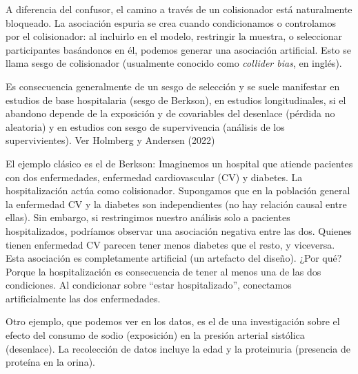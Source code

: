 \documentclass[
  spanish,
  a4paper,
]{scrbook}
\begin{document}
A diferencia del confusor, el camino a través de un colisionador está
naturalmente bloqueado. La asociación espuria se crea cuando
condicionamos o controlamos por el colisionador: al incluirlo en el
modelo, restringir la muestra, o seleccionar participantes basándonos en
él, podemos generar una asociación artificial. Esto se llama sesgo de
colisionador (usualmente conocido como \emph{collider bias}, en inglés).

Es consecuencia generalmente de un sesgo de selección y se suele
manifestar en estudios de base hospitalaria (sesgo de Berkson), en
estudios longitudinales, si el abandono depende de la exposición y de
covariables del desenlace (pérdida no aleatoria) y en estudios con sesgo
de supervivencia (análisis de los supervivientes). Ver Holmberg y
Andersen (2022)

El ejemplo clásico es el de Berkson: Imaginemos un hospital que atiende
pacientes con dos enfermedades, enfermedad cardiovascular (CV) y
diabetes. La hospitalización actúa como colisionador. Supongamos que en
la población general la enfermedad CV y la diabetes son independientes
(no hay relación causal entre ellas). Sin embargo, si restringimos
nuestro análisis solo a pacientes hospitalizados, podríamos observar una
asociación negativa entre las dos. Quienes tienen enfermedad CV parecen
tener menos diabetes que el resto, y viceversa. Esta asociación es
completamente artificial (un artefacto del diseño). ¿Por qué? Porque la
hospitalización es consecuencia de tener al menos una de las dos
condiciones. Al condicionar sobre ``estar hospitalizado'', conectamos
artificialmente las dos enfermedades.

Otro ejemplo, que podemos ver en los datos, es el de una investigación
sobre el efecto del consumo de sodio (exposición) en la presión arterial
sistólica (desenlace). La recolección de datos incluye la edad y la
proteinuria (presencia de proteína en la orina).
\end{document}
